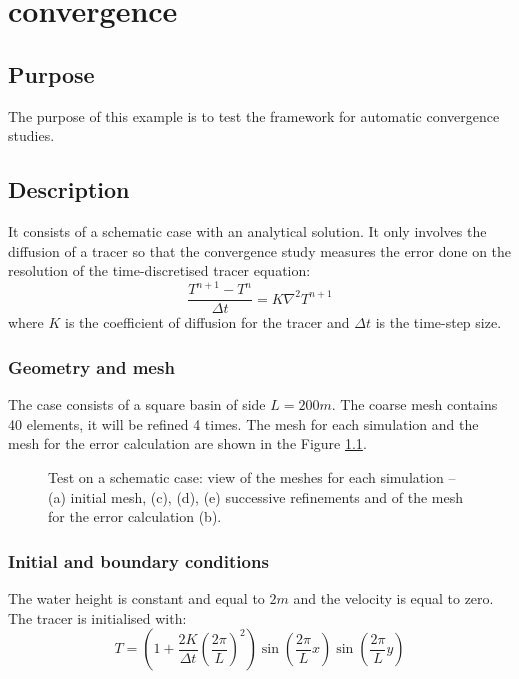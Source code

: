 \chapter{convergence}

\section{Purpose}
The purpose of this example is to test the framework for automatic
convergence studies.

\section{Description}
It consists of a schematic case with an analytical solution.
It only involves the diffusion of a tracer so that the convergence study
measures the error done on the resolution of the time-discretised
tracer equation:
\begin{equation}
\dfrac{T^{n+1} - T^{n}}{\Delta t} = K \nabla^2 T^{n+1}
\end{equation}
where $K$ is the coefficient of diffusion for the tracer
and $\Delta t$ is the time-step size.

\subsection{Geometry and mesh}
The case consists of a square basin of side $L=200m$.
The coarse mesh contains 40 elements, it will be refined 4 times.
The mesh for each simulation and the mesh for
the error calculation are shown in the Figure \ref{fig:figure1}.

\begin{figure}
  \begin{center}
    \caption{Test on a schematic case: view of the meshes for each simulation
    -- (a) initial mesh, (c), (d), (e) successive refinements and
    of the mesh for the error calculation (b).}
    \label{fig:figure1}
  \end{center}
\end{figure}

\subsection{Initial and boundary conditions}
The water height is constant and equal to $2m$ and the velocity
is equal to zero.
The tracer is initialised with:
\begin{equation}
T = \left(1 + \dfrac{2 K}{\Delta t}\left(\dfrac{2 \pi}{L}\right)^2 \right)
\sin \left(\dfrac{2 \pi}{L}x \right)
\sin \left( \dfrac{2 \pi}{L}y\right)
\end{equation}


